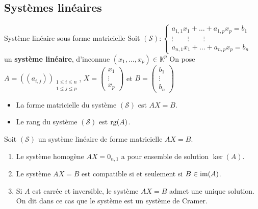 \subsection{Systèmes linéaires}

    \begin{defi}{Système linéaire sous forme matricielle}{}
        Soit $(\mathcal{S}) : \left\{ \begin{array}{l}
            a_{1,1}x_1 + \ldots + a_{1,p}x_p = b_1 \\
            \vdots \qquad \vdots \qquad \vdots \\
            a_{n,1}x_1 + \ldots + a_{n,p}x_p = b_n
        \end{array} \right.$ un \textbf{système linéaire}, d’inconnue $(x_1,\ldots,x_p) \in \mathbb{K}^p$
        On pose $A = \left((a_{i,j})\right)_{\substack{1 \leq i \leq n \\ 1 \leq j \leq p}}$, $X = \begin{pmatrix}
            x_1 \\
            \vdots \\
            x_p 
        \end{pmatrix}$ et $B = \begin{pmatrix}
            b_1 \\
            \vdots \\
            b_n
        \end{pmatrix}$
        \begin{itemize}
            \item La forme matricielle du système $(\mathcal{S})$ est $AX = B$.
            \item Le rang du système $(\mathcal{S})$ est $\operatorname{rg}(A)$.
        \end{itemize}
    \end{defi}

    \begin{prop}{}{}
        Soit $(\mathcal{S})$ un système linéaire de forme matricielle $AX = B$.
        \begin{enumerate}
            \item Le système homogène $AX = 0_{n,1}$ a pour ensemble de solution $\ker(A)$.
            \item Le système $AX = B$ est compatible si et seulement si $B \in \operatorname{im}(A)$.
            \item Si $A$ est carrée et inversible, le système $AX = B$ admet une unique solution. On dit dans ce cas que le système est un système de Cramer.
        \end{enumerate}
    \end{prop}  

